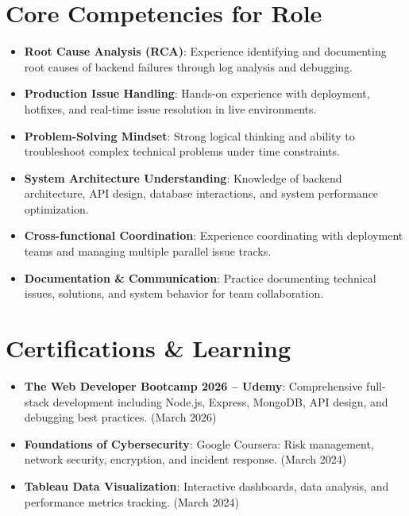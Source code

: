 \documentclass[letterpaper,11pt]{article}
\newcommand{\resumeItem}[2]{
  \item\small{
    \textbf{#1}{: #2 \vspace{-2pt}}
  }
}
\newcommand{\resumeSubItem}[2]{\resumeItem{#1}{#2}\vspace{-4pt}}
\newcommand{\resumeSubHeadingListStart}{\begin{itemize}[leftmargin=*]}
\newcommand{\resumeSubHeadingListEnd}{\end{itemize}}
\begin{document}
\section{Core Competencies for Role}
  \resumeSubHeadingListStart
    \item{
     \textbf{Root Cause Analysis (RCA)}{: Experience identifying and documenting root causes of backend failures through log analysis and debugging.}
    }
    \item{
     \textbf{Production Issue Handling}{: Hands-on experience with deployment, hotfixes, and real-time issue resolution in live environments.}
    }
    \item{
     \textbf{Problem-Solving Mindset}{: Strong logical thinking and ability to troubleshoot complex technical problems under time constraints.}
    }
    \item{
     \textbf{System Architecture Understanding}{: Knowledge of backend architecture, API design, database interactions, and system performance optimization.}
    }
    \item{
     \textbf{Cross-functional Coordination}{: Experience coordinating with deployment teams and managing multiple parallel issue tracks.}
    }
    \item{
     \textbf{Documentation \& Communication}{: Practice documenting technical issues, solutions, and system behavior for team collaboration.}
    }
  \resumeSubHeadingListEnd

\section{Certifications \& Learning}
  \resumeSubHeadingListStart
    \resumeSubItem{The Web Developer Bootcamp 2026 -- Udemy}
      {Comprehensive full-stack development including Node.js, Express, MongoDB, API design, and debugging best practices. (March 2026)}
    \resumeSubItem{Foundations of Cybersecurity}
      {Google Coursera: Risk management, network security, encryption, and incident response. (March 2024)}
    \resumeSubItem{Tableau Data Visualization}
      {Interactive dashboards, data analysis, and performance metrics tracking. (March 2024)}
  \resumeSubHeadingListEnd

\end{document}
